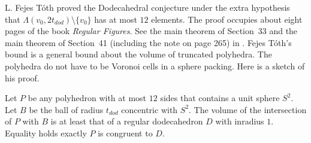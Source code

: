 L. Fejes T\'oth proved  the Dodecahedral conjecture 
under the extra hypothesis that $\Lambda(v_0,2t_{dod})\setminus\{v_0\}$
has at most $12$  elements.  The proof occupies about
eight pages of the book {\it Regular Figures}.  See the main
theorem of
Section~33 and the main theorem of Section~41 (including
the note on page 265) in \cite{Toth2}.  Fejes T\'oth's
bound is a general bound about the volume of truncated polyhedra.
The polyhedra do not have to be Voronoi cells in a sphere packing.
Here is a sketch of his proof.

\begin{theorem}  Let $P$ be any polyhedron with at most $12$ sides
that contains a unit sphere $S^2$.  Let $B$ be the ball of
radius $t_{dod}$ concentric with $S^2$.  The volume of the intersection
of $P$ with $B$ is
at least that of a regular
dodecahedron $D$ with inradius $1$.
Equality holds exactly $P$ is congruent to $D$.
\end{theorem}

